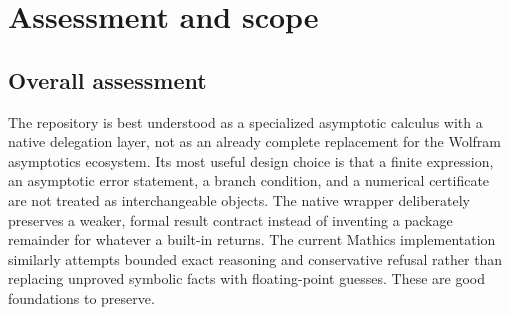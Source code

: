 \documentclass[11pt,letterpaper]{article}
\begin{document}
\begin{abstract}
This report reviews the Asymptotic repository at the Mathics-compatibility merge \texttt{7d1bc83}. The package's distinctive contribution is not merely another Taylor expander: it combines sparse real power--log calculus, selected non-power scales, inverse constructions, explicit branch and remainder information, and a separate contract for native Wolfram results. Its Mathics support is now substantial implementation work rather than a hypothetical port. Six retrieved CI artifacts contain 69 successful completed records, covering 65 distinct test IDs, but only two of those suites completed and the overall workflow was cancelled.

The audit adds reproducible runner defects concerning timeout admission, dependency coverage through the official \texttt{init.m} loader, and interrupted in-flight tests. A focused candidate patch passes six independent harness tests using fake kernels. A separate exact Gamma-inverse prototype agrees between triangular and precision-doubling Newton algorithms through order eight; a stable $W_{-1}$ prototype passes branch-point and extreme-target numerical checks. Those prototypes do not constitute accepted Wolfram/Mathics package patches, analytic error certificates, or native performance measurements. Existing review items are used as a deduplication baseline, with new implementation detail explicitly identified when a proposal sharpens an older item.
\end{abstract}
\tableofcontents
\clearpage

\section{Assessment and scope}
\subsection{Overall assessment}
The repository is best understood as a specialized asymptotic calculus with a native delegation layer, not as an already complete replacement for the Wolfram asymptotics ecosystem. Its most useful design choice is that a finite expression, an asymptotic error statement, a branch condition, and a numerical certificate are not treated as interchangeable objects. The native wrapper deliberately preserves a weaker, formal result contract instead of inventing a package remainder for whatever a built-in returns. The current Mathics implementation similarly attempts bounded exact reasoning and conservative refusal rather than replacing unproved symbolic facts with floating-point guesses. These are good foundations to preserve.\cite{repo,readme,native,mathicsdocs}
\end{document}
